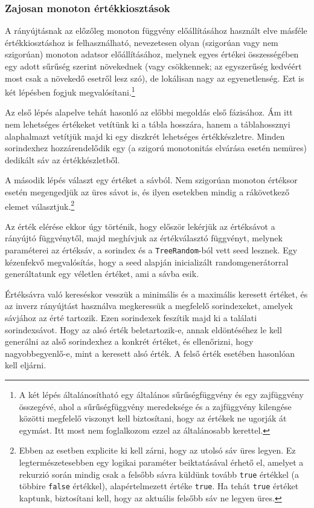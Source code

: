 \documentclass[
    parspace,
    noindent,
    nohyp,
]{elteiktdk}[2023/04/10]
\begin{document}
\subsubsection{Zajosan monoton értékkiosztások}

A rányújtásnak az előzőleg monoton függvény előállításához használt elve
másféle értékkiosztáshoz is felhasználható,
nevezetesen olyan (szigorúan vagy nem szigorúan) monoton adatsor előállításához,
melynek egyes értékei összességében egy adott sűrűség szerint növekednek
(vagy csökkennek; az egyszerűség kedvéért most csak a növekedő esetről lesz szó),
de lokálisan nagy az egyenetlenség.
Ezt is két lépésben fogjuk megvalósítani.\footnote{
  A két lépés általánosítható egy általános sűrűségfüggvény és egy zajfüggvény összegévé,
  ahol a sűrűségfüggvény meredeksége és a zajfüggvény kilengése közötti megfelelő viszonyt kell biztosítani,
  hogy az értékek ne ugorják át egymást.
  Itt most nem foglalkozom ezzel az általánosabb kerettel.
}

Az első lépés alapelve tehát hasonló az előbbi megoldás első fázisához.
Ám itt nem lehetséges értékeket vetítünk ki a tábla hosszára,
hanem a táblahossznyi alaphalmazt vetítjük majd ki egy diszkrét lehetséges értékkészletre.
Minden sorindexhez hozzárendelődik egy (a szigorú monotonitás elvárása esetén nemüres)
dedikált sáv az értékkészletből.

A második lépés választ egy értéket a sávból.
Nem szigorúan monoton értéksor esetén megengedjük az üres sávot is,
és ilyen esetekben mindig a rákövetkező elemet választjuk.\footnote{
  Ebben az esetben explicite ki kell zárni, hogy az utolsó sáv üres legyen.
  Ez legtermészetesebben egy logikai paraméter beiktatásával érhető el,
  amelyet a rekurzió során mindig csak a felsőbb sávra küldünk tovább \texttt{true} értékkel
  (a többire \texttt{false} értékkel),
  alapértelmezett értéke \texttt{true}.
  Ha tehát \texttt{true} értéket kaptunk, biztosítani kell, hogy az aktuális felsőbb sáv ne legyen üres.
}

Az érték elérése ekkor úgy történik, hogy először lekérjük az értéksávot a rányújtó függvénytől,
majd meghívjuk az értékválasztó függvényt,
melynek paraméterei az értéksáv, a sorindex és a \texttt{TreeRandom}-ból vett seed lesznek.
Egy kézenfekvő megvalósítás,
hogy a seed alapján inicializált randomgenerátorral
generáltatunk egy véletlen értéket, ami a sávba esik.

Értéksávra való kereséskor vesszük a minimális és a maximális keresett értéket,
és az inverz rányújtást használva megkeressük a megfelelő sorindexeket, amelyek sávjához az érté tartozik.
Ezen sorindexek feszítik majd ki a találati sorindexsávot.
Hogy az alsó érték beletartozik-e, annak eldöntéséhez le kell generálni
az alső sorindexhez a konkrét értéket, és ellenőrizni, hogy nagyobbegyenlő-e,
mint a keresett alsó érték.
A felső érték esetében hasonlóan kell eljárni.
\end{document}
